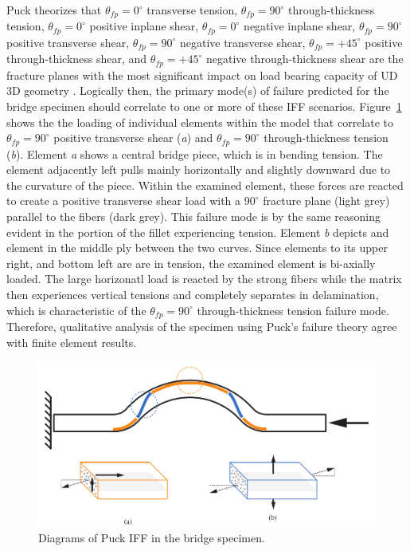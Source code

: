 Puck theorizes that $\theta_{fp} = 0^{\circ}$ transverse tension, $\theta_{fp} = 90^{\circ}$ through-thickness tension, $\theta_{fp} = 0^{\circ}$ positive inplane shear, $\theta_{fp} = 0^{\circ}$ negative inplane shear, $\theta_{fp} = 90^{\circ}$ positive transverse shear, $\theta_{fp} = 90^{\circ}$ negative transverse shear, $\theta_{fp} = +45^{\circ}$ positive through-thickness shear, and $\theta_{fp} = +45^{\circ}$ negative through-thickness shear are the fracture planes with the most significant impact on load bearing capacity of UD 3D geometry \cite{Puck-Stuttgard}. Logically then, the primary mode(s) of failure predicted for the bridge specimen should correlate to one or more of these IFF scenarios. Figure~\ref{fig:puck-failure-qualitative} shows the the loading of individual elements within the model that correlate to $\theta_{fp} = 90^{\circ}$ positive transverse shear (\emph{a}) and $\theta_{fp} = 90^{\circ}$ through-thickness tension (\emph{b}). Element \emph{a} shows a central bridge piece, which is in bending tension. The element adjacently left pulls mainly horizontally and slightly downward due to the curvature of the piece. Within the examined element, these forces are reacted to create a positive transverse shear load with a $90^{\circ}$ fracture plane (light grey) parallel to the fibers (dark grey). This failure mode is by the same reasoning evident in the portion of the fillet experiencing tension. Element \emph{b} depicts and element in the middle ply between the two curves. Since elements to its upper right, and bottom left are are in tension, the examined element is bi-axially loaded. The large horizonatl load is reacted by the strong fibers while the matrix then experiences vertical tensions and completely separates in delamination, which is characteristic of the $\theta_{fp} = 90^{\circ}$ through-thickness tension failure mode. Therefore, qualitative analysis of the specimen using Puck's failure theory agree with finite element results.\\

\begin{figure}[htp]
\centering
\includegraphics[width=1\textwidth]{./figures/fea/puck-failure-qualitative}
\caption{Diagrams of Puck IFF in the bridge specimen.}
\label{fig:puck-failure-qualitative}
\end{figure}

